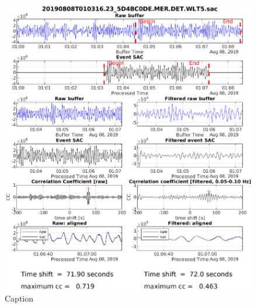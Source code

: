 \documentclass[11pt,letterpaper]{article}
\begin{document}
\begin{figure}
    \centering
    \includegraphics[width=\linewidth]{Figures/Matched_SACs/20190808T010316.eps}
    \caption{Caption}
    \label{fig:matched_end}
\end{figure}
\end{document}
